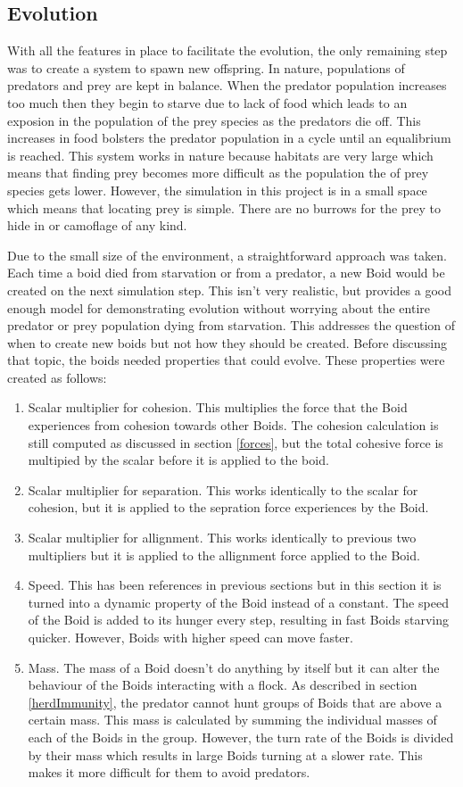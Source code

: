\documentclass{egpubl}
\begin{document}
\subsection{Evolution}
With all the features in place to facilitate the evolution, the only remaining step was to create a system to spawn new offspring. In nature, populations of predators and prey are kept in balance. When the predator population increases too much then they begin to starve due to lack of food which leads to an exposion in the population of the prey species as the predators die off. This increases in food bolsters the predator population in a cycle until an equalibrium is reached. This system works in nature because habitats are very large which means that finding prey becomes more difficult as the population the of prey species gets lower. However, the simulation in this project is in a small space which means that locating prey is simple. There are no burrows for the prey to hide in or camoflage of any kind. 
\par
Due to the small size of the environment, a straightforward approach was taken. Each time a boid died from starvation or from a predator, a new Boid would be created on the next simulation step. This isn't very realistic, but provides a good enough model for demonstrating evolution without worrying about the entire predator or prey population dying from starvation. This addresses the question of when to create new boids but not how they should be created. Before discussing that topic, the boids needed properties that could evolve. These properties were created as follows:
\begin{enumerate}
    \item Scalar multiplier for cohesion. This multiplies the force that the Boid experiences from cohesion towards other Boids. The cohesion calculation is still computed as discussed in section \ref{forces}, but the total cohesive force is multipied by the scalar before it is applied to the boid.
    \item Scalar multiplier for separation. This works identically to the scalar for cohesion, but it is applied to the sepration force experiences by the Boid.
    \item Scalar multiplier for allignment. This works identically to previous two multipliers but it is applied to the allignment force applied to the Boid.
    \item Speed. This has been references in previous sections but in this section it is turned into a dynamic property of the Boid instead of a constant. The speed of the Boid is added to its hunger every step, resulting in fast Boids starving quicker. However, Boids with higher speed can move faster.
    \item Mass. The mass of a Boid doesn't do anything by itself but it can alter the behaviour of the Boids interacting with a flock. As described in section \ref{herdImmunity}, the predator cannot hunt groups of Boids that are above a certain mass. This mass is calculated by summing the individual masses of each of the Boids in the group. However, the turn rate of the Boids is divided by their mass which results in large Boids turning at a slower rate. This makes it more difficult for them to avoid predators.
\end{enumerate}
\end{document}
